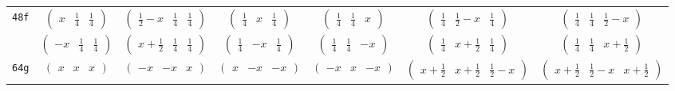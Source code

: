 \documentclass[fleqn,9pt,landscape]{jsarticle}
\begin{document}
\begin{center}
\begin{longtable}{ccccccc}
{\tt 48f} & $ \begin{pmatrix} x & \frac{1}{4} & \frac{1}{4} \end{pmatrix} $ & $ \begin{pmatrix} \frac{1}{2} - x & \frac{1}{4} & \frac{1}{4} \end{pmatrix} $ & $ \begin{pmatrix} \frac{1}{4} & x & \frac{1}{4} \end{pmatrix} $ & $ \begin{pmatrix} \frac{1}{4} & \frac{1}{4} & x \end{pmatrix} $ & $ \begin{pmatrix} \frac{1}{4} & \frac{1}{2} - x & \frac{1}{4} \end{pmatrix} $ & $ \begin{pmatrix} \frac{1}{4} & \frac{1}{4} & \frac{1}{2} - x \end{pmatrix} $ \\
& $ \begin{pmatrix} - x & \frac{1}{4} & \frac{1}{4} \end{pmatrix} $ & $ \begin{pmatrix} x + \frac{1}{2} & \frac{1}{4} & \frac{1}{4} \end{pmatrix} $ & $ \begin{pmatrix} \frac{1}{4} & - x & \frac{1}{4} \end{pmatrix} $ & $ \begin{pmatrix} \frac{1}{4} & \frac{1}{4} & - x \end{pmatrix} $ & $ \begin{pmatrix} \frac{1}{4} & x + \frac{1}{2} & \frac{1}{4} \end{pmatrix} $ & $ \begin{pmatrix} \frac{1}{4} & \frac{1}{4} & x + \frac{1}{2} \end{pmatrix} $ \\ \hline
{\tt 64g} & $ \begin{pmatrix} x & x & x \end{pmatrix} $ & $ \begin{pmatrix} - x & - x & x \end{pmatrix} $ & $ \begin{pmatrix} x & - x & - x \end{pmatrix} $ & $ \begin{pmatrix} - x & x & - x \end{pmatrix} $ & $ \begin{pmatrix} x + \frac{1}{2} & x + \frac{1}{2} & \frac{1}{2} - x \end{pmatrix} $ & $ \begin{pmatrix} x + \frac{1}{2} & \frac{1}{2} - x & x + \frac{1}{2} \end{pmatrix} $ \\

\end{longtable}
\end{center}
\end{document}
